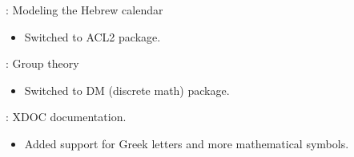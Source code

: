 
\begin{frame}

\implibtitle

:
Modeling the Hebrew calendar
\begin{itemize}
\item Switched to ACL2 package.
\end{itemize}

:
Group theory
\begin{itemize}
\item Switched to DM (discrete math) package.
\end{itemize}

\end{frame}


\begin{frame}

\implibtitle

:
XDOC documentation.
\begin{itemize}
\item Added support for Greek letters and more mathematical symbols.
\end{itemize}

\end{frame}




